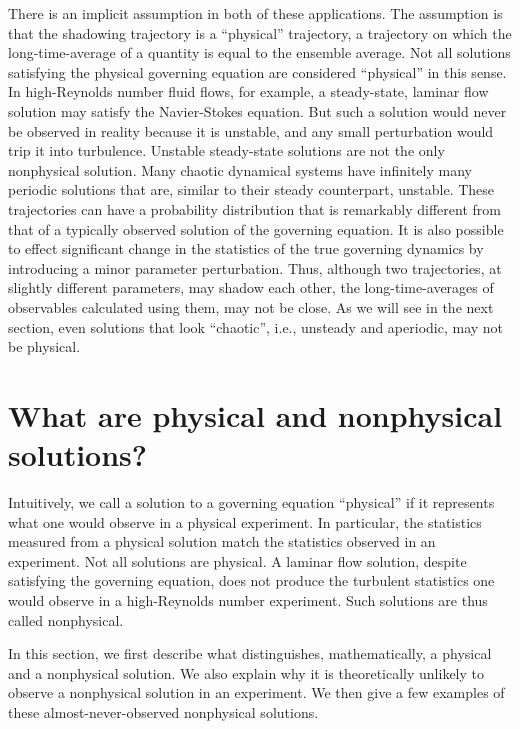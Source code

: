 There is an implicit assumption in both of these applications.  The assumption is that
the shadowing trajectory is a ``physical'' trajectory, a trajectory on which
the long-time-average of a quantity is equal to the ensemble average.
Not all solutions satisfying the physical governing equation are considered ``physical''
in this sense.  In high-Reynolds number fluid flows, for example, a steady-state, laminar flow solution may satisfy the Navier-Stokes equation. But such a solution would never be observed in reality because it is unstable, and any small perturbation
would trip it into turbulence. Unstable steady-state solutions are not the only
nonphysical solution. Many chaotic dynamical systems have infinitely many periodic
solutions that are, similar to their steady counterpart, unstable. These trajectories can have a probability distribution that is remarkably different from that of a typically observed solution of the governing equation. It is also possible to effect significant change in the statistics of the true governing dynamics by introducing a minor parameter perturbation. Thus, although two trajectories, at slightly different parameters, may shadow each other, the long-time-averages of observables calculated using them, may not be close.    
As we will see
in the next section, even solutions that look ``chaotic'', i.e., unsteady and aperiodic, may not be physical. 

\section{What are physical and nonphysical solutions?}

Intuitively, we call a solution to a governing equation ``physical'' if
it represents what one would observe in a physical experiment.  In particular, the statistics measured from a physical solution match the statistics observed
in an experiment.   Not all solutions are physical.  A laminar flow
solution, despite satisfying the governing equation, does not produce the
turbulent statistics one would observe in a high-Reynolds number experiment. Such solutions are thus called nonphysical.

In this section, we first describe what distinguishes, mathematically, a physical
and a nonphysical solution.  We also explain why it is theoretically unlikely
to observe a nonphysical solution in an experiment.  We then give a few
examples of these almost-never-observed nonphysical solutions.

